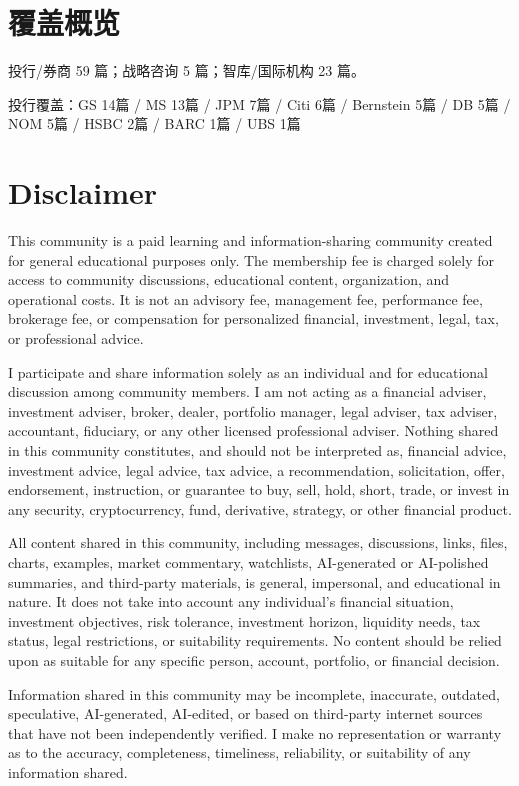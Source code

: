\documentclass[11pt]{ctexart}
\begin{document}
\section{覆盖概览}
投行/券商 59 篇；战略咨询 5 篇；智库/国际机构 23 篇。\par
投行覆盖：GS 14篇 / MS 13篇 / JPM 7篇 / Citi 6篇 / Bernstein 5篇 / DB 5篇 / NOM 5篇 / HSBC 2篇 / BARC 1篇 / UBS 1篇\par
\section{Disclaimer}
{\scriptsize\color{refgray}
This community is a paid learning and information-sharing community created for general educational purposes only. The membership fee is charged solely for access to community discussions, educational content, organization, and operational costs. It is not an advisory fee, management fee, performance fee, brokerage fee, or compensation for personalized financial, investment, legal, tax, or professional advice.\par
I participate and share information solely as an individual and for educational discussion among community members. I am not acting as a financial adviser, investment adviser, broker, dealer, portfolio manager, legal adviser, tax adviser, accountant, fiduciary, or any other licensed professional adviser. Nothing shared in this community constitutes, and should not be interpreted as, financial advice, investment advice, legal advice, tax advice, a recommendation, solicitation, offer, endorsement, instruction, or guarantee to buy, sell, hold, short, trade, or invest in any security, cryptocurrency, fund, derivative, strategy, or other financial product.\par
All content shared in this community, including messages, discussions, links, files, charts, examples, market commentary, watchlists, AI-generated or AI-polished summaries, and third-party materials, is general, impersonal, and educational in nature. It does not take into account any individual's financial situation, investment objectives, risk tolerance, investment horizon, liquidity needs, tax status, legal restrictions, or suitability requirements. No content should be relied upon as suitable for any specific person, account, portfolio, or financial decision.\par
Information shared in this community may be incomplete, inaccurate, outdated, speculative, AI-generated, AI-edited, or based on third-party internet sources that have not been independently verified. I make no representation or warranty as to the accuracy, completeness, timeliness, reliability, or suitability of any information shared.\par
}
\end{document}
